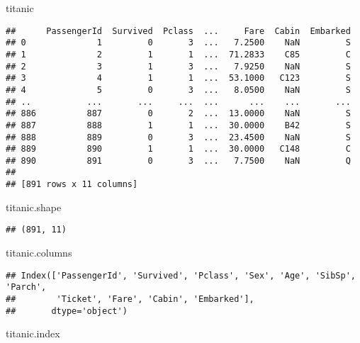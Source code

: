 \documentclass[
]{book}
\newenvironment{Shaded}{\begin{snugshade}}{\end{snugshade}}
\newcommand{\NormalTok}[1]{#1}
\begin{document}
\begin{Shaded}
\begin{Highlighting}[]
\NormalTok{titanic}
\end{Highlighting}
\end{Shaded}

\begin{verbatim}
##      PassengerId  Survived  Pclass  ...     Fare  Cabin  Embarked
## 0              1         0       3  ...   7.2500    NaN         S
## 1              2         1       1  ...  71.2833    C85         C
## 2              3         1       3  ...   7.9250    NaN         S
## 3              4         1       1  ...  53.1000   C123         S
## 4              5         0       3  ...   8.0500    NaN         S
## ..           ...       ...     ...  ...      ...    ...       ...
## 886          887         0       2  ...  13.0000    NaN         S
## 887          888         1       1  ...  30.0000    B42         S
## 888          889         0       3  ...  23.4500    NaN         S
## 889          890         1       1  ...  30.0000   C148         C
## 890          891         0       3  ...   7.7500    NaN         Q
## 
## [891 rows x 11 columns]
\end{verbatim}

\begin{Shaded}
\begin{Highlighting}[]
\NormalTok{titanic.shape}
\end{Highlighting}
\end{Shaded}

\begin{verbatim}
## (891, 11)
\end{verbatim}

\begin{Shaded}
\begin{Highlighting}[]
\NormalTok{titanic.columns}
\end{Highlighting}
\end{Shaded}

\begin{verbatim}
## Index(['PassengerId', 'Survived', 'Pclass', 'Sex', 'Age', 'SibSp', 'Parch',
##        'Ticket', 'Fare', 'Cabin', 'Embarked'],
##       dtype='object')
\end{verbatim}

\begin{Shaded}
\begin{Highlighting}[]
\NormalTok{titanic.index}
\end{Highlighting}
\end{Shaded}
\end{document}
